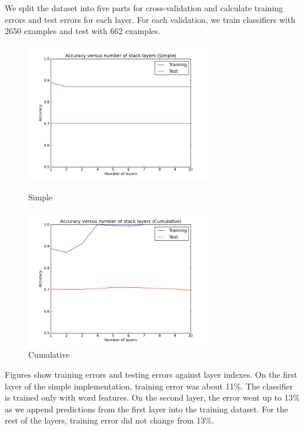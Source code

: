 We split the dataset into five parts for cross-validation and calculate training errors and test errors for each layer. For each validation, we train classifiers with 2650 examples and test with 662 examples. 
\begin{center}
\begin{figure}[ht]
	\begin{minipage}[b]{0.5\linewidth}
		\centering
		\includegraphics[width=3.2in]{images/wu10b_simple.png}
		\caption{Simple}
		\label{fig:10b_simple}
	\end{minipage}
	\hspace{0.5cm}
	\begin{minipage}[b]{0.5\linewidth}
		\centering
		\includegraphics[width=3.2in]{images/wu10b_cumulative.png}
		\caption{Cumulative}
		\label{fig:10b_cumulative}
	\end{minipage}
\end{figure}
\end{center}

Figures show training errors and testing errors against layer indexes. On the first layer of the simple implementation, training error was about 11\%. The classifier is trained only with word features. On the second layer, the error went up to 13\% as we append predictions from the first layer into the training dataset. For the rest of the layers, training error did not change from 13\%. 

